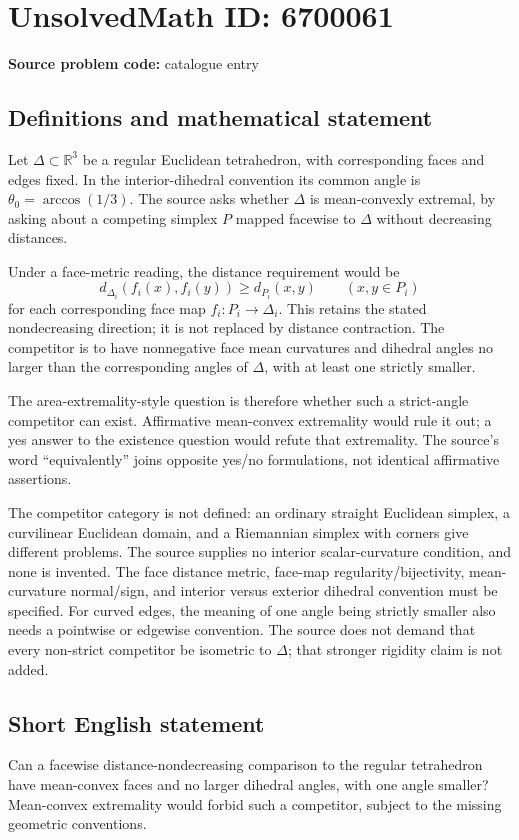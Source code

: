 \documentclass[11pt]{article}
\newcommand{\R}{\mathbb{R}}
\begin{document}
\section*{UnsolvedMath ID: 6700061}
\textbf{Source problem code:} catalogue entry
\subsection{Definitions and mathematical statement}
Let $\Delta\subset\R^3$ be a regular Euclidean tetrahedron, with corresponding faces and edges fixed. In the interior-dihedral convention its common angle is $\theta_0=\arccos(1/3)$. The source asks whether $\Delta$ is mean-convexly extremal, by asking about a competing simplex $P$ mapped facewise to $\Delta$ without decreasing distances.

Under a face-metric reading, the distance requirement would be
\[
d_{\Delta_i}(f_i(x),f_i(y))\geq d_{P_i}(x,y)
\qquad(x,y\in P_i)
\]
for each corresponding face map $f_i:P_i\to\Delta_i$. This retains the stated nondecreasing direction; it is not replaced by distance contraction. The competitor is to have nonnegative face mean curvatures and dihedral angles no larger than the corresponding angles of $\Delta$, with at least one strictly smaller.

The area-extremality-style question is therefore whether such a strict-angle competitor can exist. Affirmative mean-convex extremality would rule it out; a yes answer to the existence question would refute that extremality. The source's word ``equivalently'' joins opposite yes/no formulations, not identical affirmative assertions.

The competitor category is not defined: an ordinary straight Euclidean simplex, a curvilinear Euclidean domain, and a Riemannian simplex with corners give different problems. The source supplies no interior scalar-curvature condition, and none is invented. The face distance metric, face-map regularity/bijectivity, mean-curvature normal/sign, and interior versus exterior dihedral convention must be specified. For curved edges, the meaning of one angle being strictly smaller also needs a pointwise or edgewise convention. The source does not demand that every non-strict competitor be isometric to $\Delta$; that stronger rigidity claim is not added.
\subsection{Short English statement}
Can a facewise distance-nondecreasing comparison to the regular tetrahedron have mean-convex faces and no larger dihedral angles, with one angle smaller? Mean-convex extremality would forbid such a competitor, subject to the missing geometric conventions.
\end{document}
